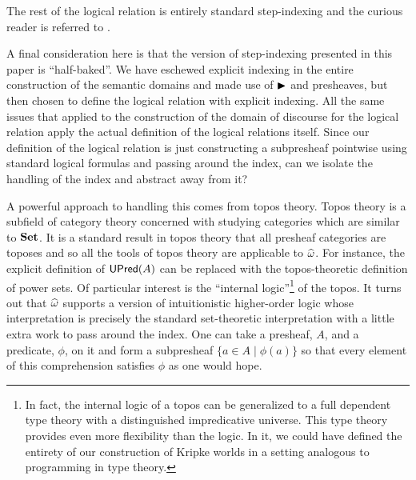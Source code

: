 The rest of the logical relation is entirely standard step-indexing
and the curious reader is referred to \citet{Ahmed:04}.

A final consideration here is that the version of step-indexing
presented in this paper is ``half-baked''. We have eschewed explicit
indexing in the entire construction of the semantic domains and made
use of ${\blacktriangleright}$ and presheaves, but then chosen to define the logical
relation with explicit indexing. All the same issues that applied to
the construction of the domain of discourse for the logical relation
apply the actual definition of the logical relations itself. Since our
definition of the logical relation is just constructing a subpresheaf
pointwise using standard logical formulas and passing around the index,
can we isolate the handling of the index and abstract away from it?

A powerful approach to handling this comes from topos theory. Topos
theory is a subfield of category theory concerned with studying
categories which are similar to $\mathbf{Set}$. It is a standard result in
topos theory that all presheaf categories are toposes and so all the
tools of topos theory are applicable to $\widehat{\omega}$. For
instance, the explicit definition of $\mathsf{UPred}(A)$ can be replaced with
the topos-theoretic definition of power sets. Of particular interest
is the ``internal logic''\footnote{In fact, the internal logic of a
  topos can be generalized to a full dependent type theory with a
  distinguished impredicative universe. This type theory provides even
  more flexibility than the logic. In it, we could have defined the
  entirety of our construction of Kripke worlds in a setting analogous to
  programming in type theory.} of the topos. It turns out that
$\widehat{\omega}$ supports a version of intuitionistic
higher-order logic whose interpretation is precisely the standard
set-theoretic interpretation with a little extra work to pass around
the index. One can take a presheaf, $A$, and a predicate, $\phi$, on
it and form a subpresheaf $\{ a \in A \mid \phi(a) \}$ so that every
element of this comprehension satisfies $\phi$ as one would hope.

